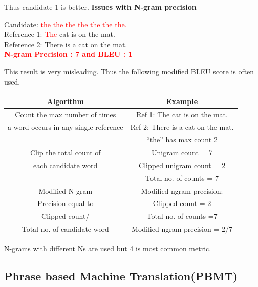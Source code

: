 \documentclass[conference]{IEEEtran}
\begin{document}
Thus candidate 1 is better.
\textbf{Issues with N-gram precision}


Candidate: \textcolor{red} {the the the the the the the.} \\
Reference 1: \textcolor{red} {The} cat is on the mat. \\
Reference 2: There is a cat on the mat.\\

\textbf{ \textcolor{red}{N-gram Precision : 7 and BLEU : 1}}

This result is very misleading. Thus the following modified BLEU score is often used.
 \begin{table}[h]
    \centering
    \begin{tabular}{|c|c|}
        \hline
        \textbf{Algorithm}  & \textbf{Example}  \\ \hline
        Count the max number of times       &       Ref 1: The cat is on the mat.  \\
        a word occurs in any single reference &   Ref 2: There is a cat on the mat. \\
        &“the” has max count 2         \\ %
 \hline
	Clip the total count of & Unigram count = 7 \\
	each candidate word & Clipped unigram count = 2 \\
	&Total no. of counts = 7 \\
\hline
	Modified N-gram & Modified-ngram precision: \\
	Precision equal to & Clipped count = 2 \\
	Clipped count/ & Total no. of counts =7\\
	Total no. of candidate word & Modified-ngram precision = 2/7\\
\hline	
    \end{tabular}
    \end{table}
N-grams with different Ns are used but 4 is most common metric.

\subsection{Phrase based Machine Translation(PBMT)}
\end{document}

